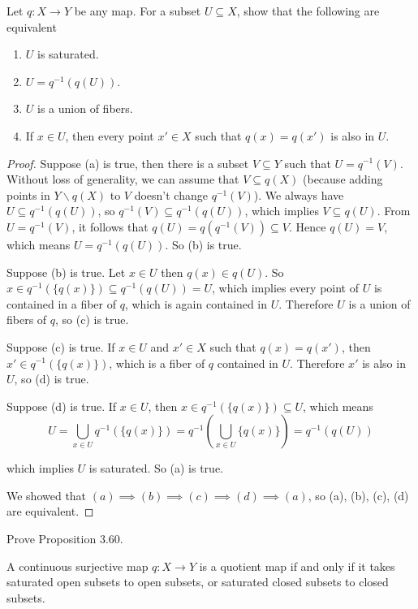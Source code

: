 \begin{exercise}{3.59}\label{exercise:3.59}
	Let $q: X\to Y$ be any map. For a subset $U\subseteq X$, show that the following are equivalent
	\begin{enumerate}[label={(\alph*)}]
		\item $U$ is saturated.
		\item $U = q^{-1}(q(U))$.
		\item $U$ is a union of fibers.
		\item If $x\in U$, then every point $x'\in X$ such that $q(x) = q(x')$ is also in $U$.
	\end{enumerate}
\end{exercise}

\begin{proof}
	Suppose (a) is true, then there is a subset $V\subseteq Y$ such that $U = q^{-1}(V)$. Without loss of generality, we can assume that $V\subseteq q(X)$ (because adding points in $Y\smallsetminus q(X)$ to $V$ doesn't change $q^{-1}(V)$). We always have $U\subseteq q^{-1}(q(U))$, so $q^{-1}(V)\subseteq q^{-1}(q(U))$, which implies $V\subseteq q(U)$. From $U = q^{-1}(V)$, it follows that $q(U) = q(q^{-1}(V))\subseteq V$. Hence $q(U) = V$, which means $U = q^{-1}(q(U))$. So (b) is true.

	Suppose (b) is true. Let $x\in U$ then $q(x)\in q(U)$. So $x\in q^{-1}(\{ q(x) \})\subseteq q^{-1}(q(U)) = U$, which implies every point of $U$ is contained in a fiber of $q$, which is again contained in $U$. Therefore $U$ is a union of fibers of $q$, so (c) is true.

	Suppose (c) is true. If $x\in U$ and $x'\in X$ such that $q(x) = q(x')$, then $x'\in q^{-1}(\{q(x)\})$, which is a fiber of $q$ contained in $U$. Therefore $x'$ is also in $U$, so (d) is true.

	Suppose (d) is true. If $x\in U$, then $x\in q^{-1}(\{ q(x) \})\subseteq U$, which means
	\[
		U = \bigcup_{x\in U}q^{-1}(\{ q(x) \}) = q^{-1}\left(\bigcup_{x\in U}\{ q(x) \}\right) = q^{-1}(q(U))
	\]

	which implies $U$ is saturated. So (a) is true.

	We showed that $(a)\implies (b) \implies (c) \implies (d) \implies (a)$, so (a), (b), (c), (d) are equivalent.
\end{proof}

\begin{exercise}{3.61}\label{exercise:3.61}
	Prove Proposition 3.60.

	A continuous surjective map $q: X\to Y$ is a quotient map if and only if it takes saturated open subsets to open subsets, or saturated closed subsets to closed subsets.
\end{exercise}

